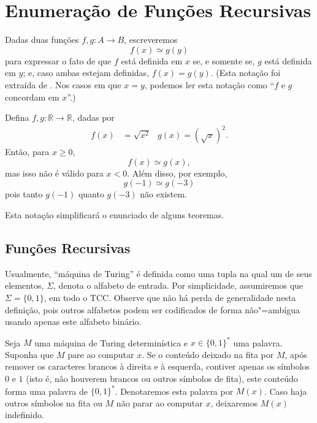 \section{Enumeração de Funções Recursivas}
\label{sec:enumeration_of_recursive_functions}

\begin{notation}
    Dadas duas funções $f, g: A \to B$,
    escreveremos
    \begin{equation*}
        f(x) \simeq g(y)
    \end{equation*}
    para expressar o fato de que
    $f$ está definida em $x$ se, e somente se, $g$ está definida em $y$;
    e, caso ambas estejam definidas,
    $f(x) = g(y)$.
    (Esta notação foi extraída de .
    Nos casos em que $x = y$,
    podemos ler esta notação como ``$f$ e $g$ concordam em $x$''.)
\end{notation}

\begin{example}
    Defina $f, g: \mathbb R \to \mathbb R$, dadas por
    \begin{align*}
        f(x) &= \sqrt{x^2} & g(x) = {(\sqrt x)}^2.
    \end{align*}
    Então, para $x \geq 0$,
    \begin{equation*}
        f(x) \simeq g(x),
    \end{equation*}
    mas isso não é válido para $x < 0$.
    Além disso, por exemplo,
    \begin{equation*}
        g(-1) \simeq g(-3)
    \end{equation*}
    pois tanto $g(-1)$ quanto $g(-3)$ não existem.
\end{example}

Esta notação simplificará o enunciado de alguns teoremas.

\subsection{Funções Recursivas}

Usualmente,
``máquina de Turing'' é definida como uma tupla
na qual um de seus elementos,
$\Sigma$,
denota o alfabeto de entrada.
Por simplicidade,
assumiremos que $\Sigma = \{0, 1\}$,
em todo o TCC.
Observe que não há perda de generalidade nesta definição,
pois outros alfabetos podem ser codificados de forma não"=ambígua
usando apenas este alfabeto binário.

\begin{notation}
    Seja $M$ uma máquina de Turing determinística
    e $x \in \{0, 1\}^*$ uma palavra.
    Suponha que $M$ pare ao computar $x$.
    Se o conteúdo deixado na fita por $M$,
    após remover os caracteres brancos à direita e à esquerda,
    contiver apenas os símbolos $0$ e $1$
    (isto é, não houverem brancos ou outros símbolos de fita),
    este conteúdo forma uma palavra de $\{0, 1\}^*$.
    Denotaremos esta palavra por $M(x)$.
    Caso haja outros símbolos na fita
    ou $M$ não parar ao computar $x$,
    deixaremos $M(x)$ indefinido.
\end{notation}

